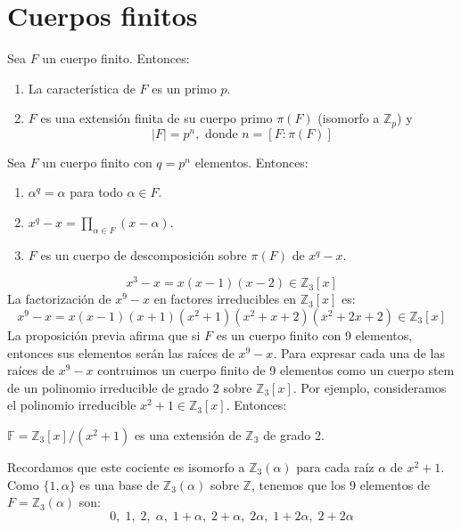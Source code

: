 \chapter{Cuerpos finitos}

\begin{proposition}
    Sea $F$ un cuerpo finito. Entonces:
    \begin{enumerate}
        \item La característica de $F$ es un primo $p$.
        \item $F$ es una extensión finita de su cuerpo primo $\pi(F)$ (isomorfo a $\mathbb{Z}_p$) y $$|F| = p^n, \text{ donde } n = [F : \pi(F)]$$
    \end{enumerate}
\end{proposition}

\begin{proposition}
    Sea $F$ un cuerpo finito con $q = p^n$ elementos. Entonces:
    \begin{enumerate}
        \item $\alpha^q = \alpha$ para todo $\alpha \in F$.
        \item $x^q - x = \prod_{\alpha \in F} (x-\alpha)$.
        \item $F$ es un cuerpo de descomposición sobre $\pi(F)$ de $x^q - x$.
    \end{enumerate}
\end{proposition}

\begin{example}
    $$x^3-x = x(x-1)(x-2) \in \mathbb{Z}_3[x]$$
    La factorización de $x^9-x$ en factores irreducibles en $\mathbb{Z}_3[x]$ es:
    $$x^9-x = x(x-1)(x+1)(x^2+1)(x^2+x+2)(x^2+2x+2) \in \mathbb{Z}_3[x]$$
    La proposición previa afirma que si $F$ es un cuerpo finito con 9 elementos, entonces sus elementos serán las raíces de $x^9-x$.
    Para expresar  cada una de las raíces de $x^9-x$ contruimos un cuerpo finito de 9 elementos como un cuerpo stem de un polinomio irreducible de grado 2 sobre $\mathbb{Z}_3[x]$.
    Por ejemplo, consideramos el polinomio irreducible $x^2+1 \in \mathbb{Z}_3[x]$. Entonces:
    \begin{center}
        $\mathbb{F} = \mathbb{Z}_3[x]/(x^2+1)$ es una extensión de $\mathbb{Z_3}$ de grado 2.
    \end{center}
    Recordamos que este cociente es isomorfo a $\mathbb{Z}_3(\alpha)$ para cada raíz $\alpha$ de $x^2+1$.
    Como $\{ 1, \alpha \}$ es una base de $\mathbb{Z}_3(\alpha)$ sobre $\mathbb{Z}$, tenemos que los 9 elementos de $F = \mathbb{Z}_3(\alpha)$ son:
    $$0, \; 1, \; 2, \; \alpha, \; 1+\alpha, \; 2+\alpha, \; 2\alpha, \; 1+2\alpha, \; 2+2\alpha$$
\end{example}

